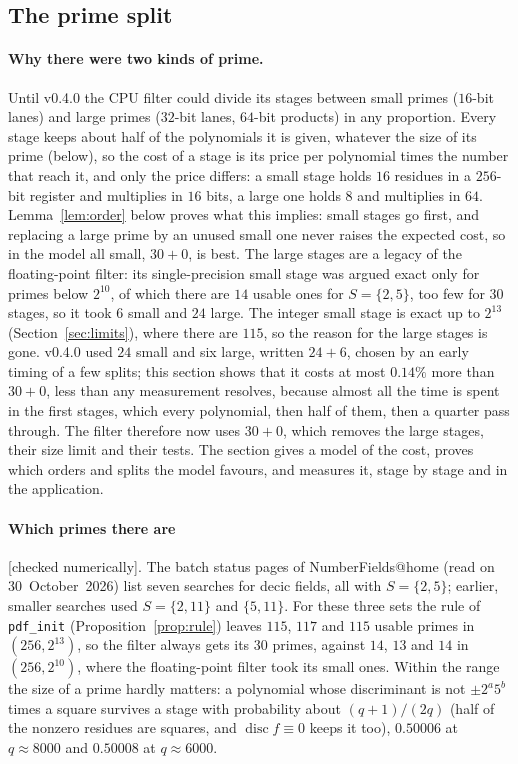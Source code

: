 \documentclass[10pt,a4paper]{article}
\DeclareMathOperator{\disc}{disc}
\newcommand{\code}[1]{\texttt{#1}}
\newcommand{\stnum}{\textsf{\small[checked numerically]}\xspace}
\theoremstyle{plain}
\theoremstyle{definition}
\begin{document}
\subsection{The prime split}\label{sec:split}

\paragraph{Why there were two kinds of prime.}  Until v0.4.0 the CPU filter could divide its stages between small primes ($16$-bit lanes) and large primes
($32$-bit lanes, $64$-bit products) in any proportion.  Every stage keeps about half of the polynomials it is given, whatever the size of its prime (below), so the cost of a stage
is its price per polynomial times the number that reach it, and only the price differs: a small stage holds $16$ residues in a $256$-bit register and multiplies in
$16$ bits, a large one holds $8$ and multiplies in $64$.  Lemma~\ref{lem:order} below proves what this implies: small stages go first, and replacing a large prime by
an unused small one never raises the expected cost, so in the model all small, $30+0$, is best.  The large stages are a legacy of the floating-point filter: its
single-precision small stage was argued exact only for primes below $2^{10}$, of which there are $14$ usable ones for $S=\{2,5\}$, too few for $30$ stages, so it
took $6$ small and $24$ large.  The integer small stage is exact up to $2^{13}$ (Section~\ref{sec:limits}), where there are $115$, so the reason for the large
stages is gone.  v0.4.0 used $24$ small and six large, written $24+6$, chosen by an early timing of a few splits; this section shows that it costs at most
$0.14\%$ more than $30+0$, less than any measurement resolves, because almost all the time is spent in the first stages, which every polynomial, then half of them,
then a quarter pass through.  The filter therefore now uses $30+0$, which removes the large stages, their size limit and their tests.  The section gives a model of
the cost, proves which orders and splits the model favours, and measures it, stage by stage and in the application.

\paragraph{Which primes there are} \stnum.  The batch status pages of NumberFields@home (read on 30~October~2026) list seven searches for decic fields, all with
$S=\{2,5\}$; earlier, smaller searches used $S=\{2,11\}$ and $\{5,11\}$.  For these three sets the rule of \code{pdf\_init} (Proposition~\ref{prop:rule}) leaves
$115$, $117$ and $115$ usable primes in $(256,2^{13})$, so the filter always gets its $30$ primes, against $14$, $13$ and $14$ in $(256,2^{10})$, where the floating-point
filter took its small ones.  Within the range the size of a prime hardly matters: a polynomial whose discriminant is not $\pm2^a5^b$ times a square survives a stage with
probability about $(q+1)/(2q)$ (half of the nonzero residues are squares, and $\disc f\equiv0$ keeps it too), $0.50006$ at $q\approx8000$ and $0.50008$ at
$q\approx6000$.
\end{document}
